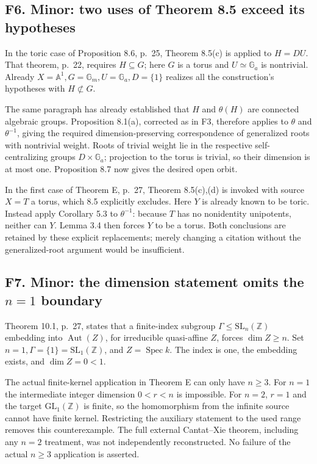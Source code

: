 \documentclass[10pt]{article}
\begin{document}
\subsection*{F6. Minor: two uses of Theorem 8.5 exceed its hypotheses}
In the toric case of Proposition 8.6, p. 25, Theorem 8.5(c) is applied to \(H=DU\). That theorem, p. 22, requires \(H\subseteq G\); here \(G\) is a torus and \(U\simeq\mathbb G_a\) is nontrivial. Already \(X=\mathbb A^1,G=\mathbb G_m,U=\mathbb G_a,D=\{1\}\) realizes all the construction’s hypotheses with \(H\not\subset G\).\par
The same paragraph has already established that \(H\) and \(\theta(H)\) are connected algebraic groups. Proposition 8.1(a), corrected as in F3, therefore applies to \(\theta\) and \(\theta^{-1}\), giving the required dimension-preserving correspondence of generalized roots with nontrivial weight. Roots of trivial weight lie in the respective self-centralizing groups \(D\times\mathbb G_a\); projection to the torus is trivial, so their dimension is at most one. Proposition 8.7 now gives the desired open orbit.\par
In the first case of Theorem E, p. 27, Theorem 8.5(c),(d) is invoked with source \(X=T\) a torus, which 8.5 explicitly excludes. Here \(Y\) is already known to be toric. Instead apply Corollary 5.3 to \(\theta^{-1}\): because \(T\) has no nonidentity unipotents, neither can \(Y\). Lemma 3.4 then forces \(Y\) to be a torus. Both conclusions are retained by these explicit replacements; merely changing a citation without the generalized-root argument would be insufficient.\par
\subsection*{F7. Minor: the dimension statement omits the \(n=1\) boundary}
Theorem 10.1, p. 27, states that a finite-index subgroup \(\Gamma\le\mathrm{SL}_n(\mathbb Z)\) embedding into \(\operatorname{Aut}(Z)\), for irreducible quasi-affine \(Z\), forces \(\dim Z\ge n\). Set \(n=1,\Gamma=\{1\}=\mathrm{SL}_1(\mathbb Z)\), and \(Z=\operatorname{Spec}k\). The index is one, the embedding exists, and \(\dim Z=0<1\).\par
The actual finite-kernel application in Theorem E can only have \(n\ge3\). For \(n=1\) the intermediate integer dimension \(0<r<n\) is impossible. For \(n=2\), \(r=1\) and the target \(\mathrm{GL}_1(\mathbb Z)\) is finite, so the homomorphism from the infinite source cannot have finite kernel. Restricting the auxiliary statement to the used range removes this counterexample. The full external Cantat–Xie theorem, including any \(n=2\) treatment, was not independently reconstructed. No failure of the actual \(n\ge3\) application is asserted.\par
\end{document}
